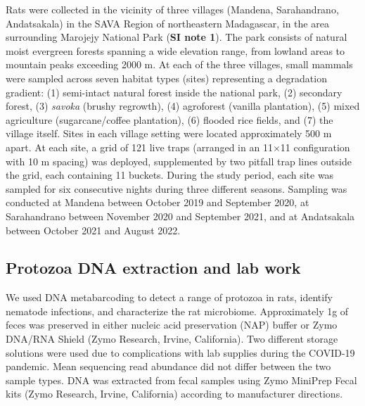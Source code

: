 \documentclass[oneside, a4paper, onecolumn, 11pt]{article}
\begin{document}
Rats were collected in the vicinity of three villages (Mandena, Sarahandrano, Andatsakala) in the SAVA Region of northeastern Madagascar, in the area surrounding Marojejy National Park (\textbf{SI note 1}). The park consists of natural moist evergreen forests spanning a wide elevation range, from lowland areas to mountain peaks exceeding 2000 m. At each of the three villages, small mammals were sampled across seven habitat types (sites) representing a degradation gradient: (1) semi-intact natural forest inside the national park, (2) secondary forest, (3) \textit{savoka} (brushy regrowth), (4) agroforest (vanilla plantation), (5) mixed agriculture (sugarcane/coffee plantation), (6) flooded rice fields, and (7) the village itself. Sites in each village setting were located approximately 500 m apart. At each site, a grid of 121 live traps (arranged in an 11$\times$11 configuration with 10 m spacing) was deployed, supplemented by two pitfall trap lines outside the grid, each containing 11 buckets. During the study period, each site was sampled for six consecutive nights during three different seasons. Sampling was conducted at Mandena between October 2019 and September 2020, at Sarahandrano between November 2020 and September 2021, and at Andatsakala between October 2021 and August 2022.

\subsection*{Protozoa DNA extraction and lab work}
We used DNA metabarcoding to detect a range of protozoa in rats, identify nematode infections, and characterize the rat microbiome. Approximately 1g of feces was preserved in either nucleic acid preservation (NAP) buffer \citep{Camacho-Sanchez2013-my} or Zymo DNA/RNA Shield (Zymo Research, Irvine, California). Two different storage solutions were used due to complications with lab supplies during the COVID-19 pandemic. Mean sequencing read abundance did not differ between the two sample types. DNA was extracted from fecal samples using Zymo MiniPrep Fecal kits (Zymo Research, Irvine, California) according to manufacturer directions. 
\end{document}
